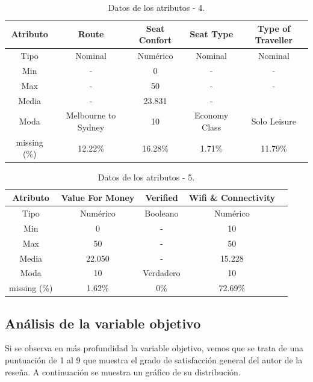 \documentclass[es]{uc3mreport}
\begin{document}
\begin{report}
\begin{table}[H]
\begin{tabular}{@{}ccccc@{}}
        \toprule
        Atributo     & Route               & Seat Confort & Seat Type     & Type of Traveller \\
        \midrule
        Tipo         & Nominal             & Numérico     & Nominal       & Nominal           \\
        Min          & -                   & 0            & -             & -                 \\
        Max          & -                   & 50           & -             & -                 \\
        Media        & -                   & 23.831       & -             &                   \\
        Moda         & Melbourne to Sydney & 10           & Economy Class & Solo Leisure      \\
        missing (\%) & 12.22\%             & 16.28\%      & 1.71\%        & 11.79\%           \\
        \bottomrule
    \end{tabular}
    \caption{Datos de los atributos - 4.}
\end{table}
\begin{table}[H]
    \center
    \begin{tabular}{@{}ccccc@{}}
        \toprule
        Atributo     & Value For Money & Verified  & Wifi \& Connectivity \\
        \midrule
        Tipo         & Numérico        & Booleano  & Numérico             \\
        Min          & 0               & -         & 10                   \\
        Max          & 50              & -         & 50                   \\
        Media        & 22.050          & -         & 15.228               \\
        Moda         & 10              & Verdadero & 10                   \\
        missing (\%) & 1.62\%          & 0\%       & 72.69\%              \\
        \bottomrule
    \end{tabular}
    \caption{Datos de los atributos - 5.}
\end{table}

\subsection{Análisis de la variable objetivo}
\label{subsec:variable-objetivo}
Si se observa en más profundidad la variable objetivo, vemos que se trata de una
puntuación de 1 al 9 que muestra el grado de satisfacción general del autor de
la reseña. A continuación se muestra un gráfico de su distribución.


\end{report}
\end{document}
